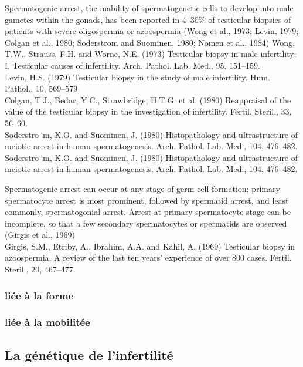 \documentclass[12pt,twoside]{reedthesis}
\theoremstyle{definition}
\theoremstyle{definition}
\theoremstyle{remark}
\begin{document}
  Spermatogenic arrest, the inability of spermatogenetic cells to develop
  into male gametes within the gonads, has been reported in 4--30\% of
  testicular biopsies of patients with severe oligospermia or azoospermia
  (Wong et al., 1973; Levin, 1979; Colgan et al., 1980; Soderstrom and
  Suominen, 1980; Nomen et al., 1984) Wong, T.W., Strauss, F.H. and Worne,
  N.E. (1973) Testicular biopsy in male infertility: I. Testicular causes
  of infertility. Arch. Pathol. Lab. Med., 95, 151--159.\\
  Levin, H.S. (1979) Testicular biopsy in the study of male infertility.
  Hum. Pathol., 10, 569--579\\
  Colgan, T.J., Bedar, Y.C., Strawbridge, H.T.G. et al. (1980) Reappraisal
  of the value of the testicular biopsy in the investigation of
  infertility. Fertil. Steril., 33, 56--60.\\
  Soderstro¨m, K.O. and Suominen, J. (1980) Histopathology and
  ultrastructure of meiotic arrest in human spermatogenesis. Arch. Pathol.
  Lab. Med., 104, 476--482.\\
  Soderstro¨m, K.O. and Suominen, J. (1980) Histopathology and
  ultrastructure of meiotic arrest in human spermatogenesis. Arch. Pathol.
  Lab. Med., 104, 476--482.
  
  Spermatogenic arrest can occur at any stage of germ cell formation;
  primary spermatocyte arrest is most prominent, followed by spermatid
  arrest, and least commonly, spermatogonial arrest. Arrest at primary
  spermatocyte stage can be incomplete, so that a few secondary
  spermatocytes or spermatids are observed (Girgis et al., 1969)\\
  Girgis, S.M., Etriby, A., Ibrahim, A.A. and Kahil, A. (1969) Testicular
  biopsy in azoospermia. A review of the last ten years' experience of
  over 800 cases. Fertil. Steril., 20, 467--477.
  
  \subsubsection{liée à la forme}\label{liee-a-la-forme}
  
  \subsubsection{liée à la mobilitée}\label{liee-a-la-mobilitee}
  
  \subsection{La génétique de
  l'infertilité}\label{la-genetique-de-linfertilite}
  
\end{document}
